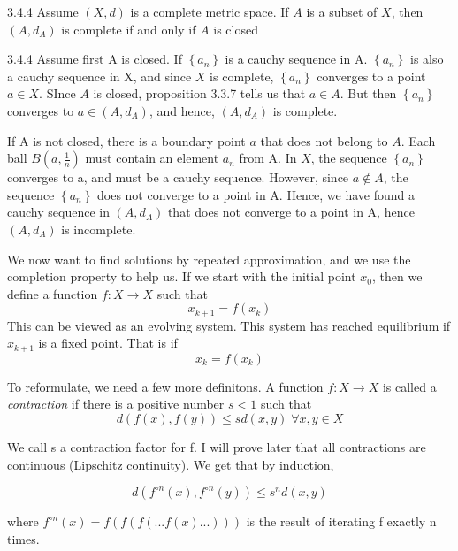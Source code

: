\documentclass[a4paper,norsk]{article}
\renewcommand{\leq}{\leqslant}
\begin{document}
\begin{propositionbox}{3.4.4}{}
Assume $ \left( X, d \right)  $ is a complete metric space. If $ A $ is a subset of $ X $, then $ \left( A, d_A \right)  $ is complete if and only if $ A $ is closed

\begin{proofbox}{3.4.4}{}
  Assume first A is closed. If $ \left\{ a_n \right\}  $ is a cauchy sequence in A. $ \left\{ a_n \right\}  $ is also a cauchy sequence in X, and since $ X $ is complete, $ \left\{ a_n \right\}  $ converges to a point $ a \in X $. SInce $ A $ is closed, proposition 3.3.7 tells us that $ a \in A $. But then $ \left\{ a_n \right\}  $ converges to $ a \in \left( A, d_A \right)  $, and hence, $ \left( A,d_A \right)  $ is complete.

  If A is not closed, there is a boundary point $ a  $ that does not belong to $ A $. Each ball $ B \left( a, \frac{ 1}{ n } \right)  $ must contain an element $ a_n $ from A. In $ X $, the sequence $ \left\{ a_n \right\}  $ converges to a, and must be a cauchy sequence. However, since $ a \notin A $, the sequence $ \left\{ a_n \right\}  $ does not converge to a point in A. Hence, we have found a cauchy sequence in $ \left( A, d_A \right)  $ that does not converge to a point in A, hence $ \left( A, d_A \right)  $ is incomplete.
\end{proofbox}
\end{propositionbox}



We now want to find solutions by repeated approximation, and we use the completion property to help us. If we start with the initial point $ x_0 $, then we define a function $ f : X \to X $  such that
\[
    x_{k+1} = f(x_k)
\]
This can be viewed as an evolving system. This system has reached equilibrium if $ x_{k+1} $ is a fixed point. That is if
\[
    x_k = f(x_k)
\]


To reformulate, we need a few more definitons. A function $ f: X \to X $ is called a \textit{contraction} if there is a positive number $ s < 1 $ such that
\[
    d \left( f(x), f(y) \right) \leq s d(x, y) \; \forall x, y \in X
\]

We call s a contraction factor for f. I will prove later that all contractions are continuous (Lipschitz continuity). We get that by induction,

\[
    d \left( f^{\circ n} (x), f^{\circ n} (y) \right) \leq s^n d(x, y)
\]

where $ f^{\circ n} (x) = f \left( f \left( f \left( ...f(x) ... \right)  \right)  \right)  $ is the result of iterating f exactly n times. 
\end{document}
